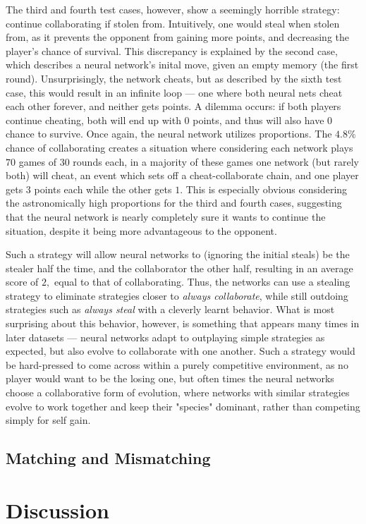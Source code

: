 \documentclass{article}
\begin{document}
The third and fourth test cases, however, show a seemingly horrible strategy: continue collaborating if stolen from. Intuitively, one would steal when stolen from, as it prevents the opponent from gaining more points, and decreasing the player's chance of survival. This discrepancy is explained by the second case, which describes a neural network's inital move, given an empty memory (the first round). Unsurprisingly, the network cheats, but as described by the sixth test case, this would result in an infinite loop --- one where both neural nets cheat each other forever, and neither gets points. A dilemma occurs: if both players continue cheating, both will end up with $0$ points, and thus will also have $0$ chance to survive. Once again, the neural network utilizes proportions. The $4.8\%$ chance of collaborating creates a situation where considering each network plays $70$ games of $30$ rounds each, in a majority of these games one network (but rarely both) will cheat, an event which sets off a cheat-collaborate chain, and one player gets $3$ points each while the other gets $1$. This is especially obvious considering the astronomically high proportions for the third and fourth cases, suggesting that the neural network is nearly completely sure it wants to continue the situation, despite it being more advantageous to the opponent. 

Such a strategy will allow neural networks to (ignoring the initial steals) be the stealer half the time, and the collaborator the other half, resulting in an average score of $2,$ equal to that of collaborating. Thus, the networks can use a stealing strategy to eliminate strategies closer to \textit{always collaborate}, while still outdoing strategies such as \textit{always steal} with a cleverly learnt behavior. What is most surprising about this behavior, however, is something that appears many times in later datasets --- neural networks adapt to outplaying simple strategies as expected, but also evolve to collaborate with one another. Such a strategy would be hard-pressed to come across within a purely competitive environment, as no player would want to be the losing one, but often times the neural networks choose a collaborative form of evolution, where networks with similar strategies evolve to work together and keep their "species" dominant, rather than competing simply for self gain.

\subsection{Matching and Mismatching}



\section{Discussion}
\end{document}
